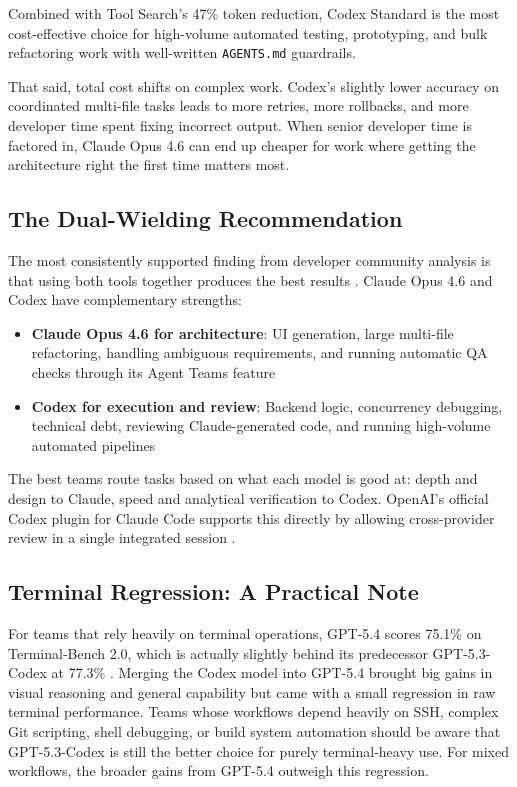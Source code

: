 \documentclass[conference]{IEEEtran}
\begin{document}
Combined with Tool Search's 47\% token reduction, Codex Standard is the most cost-effective choice for high-volume automated testing, prototyping, and bulk refactoring work with well-written \texttt{AGENTS.md} guardrails.

That said, total cost shifts on complex work. Codex's slightly lower accuracy on coordinated multi-file tasks leads to more retries, more rollbacks, and more developer time spent fixing incorrect output. When senior developer time is factored in, Claude Opus 4.6 can end up cheaper for work where getting the architecture right the first time matters most.

\subsection{The Dual-Wielding Recommendation}
The most consistently supported finding from developer community analysis is that using both tools together produces the best results \cite{chandler2026}. Claude Opus 4.6 and Codex have complementary strengths:

\begin{itemize}
    \item \textbf{Claude Opus 4.6 for architecture}: UI generation, large multi-file refactoring, handling ambiguous requirements, and running automatic QA checks through its Agent Teams feature
    \item \textbf{Codex for execution and review}: Backend logic, concurrency debugging, technical debt, reviewing Claude-generated code, and running high-volume automated pipelines
\end{itemize}

The best teams route tasks based on what each model is good at: depth and design to Claude, speed and analytical verification to Codex. OpenAI's official Codex plugin for Claude Code supports this directly by allowing cross-provider review in a single integrated session \cite{mindstudio2026}.

\subsection{Terminal Regression: A Practical Note}
For teams that rely heavily on terminal operations, GPT-5.4 scores 75.1\% on Terminal-Bench 2.0, which is actually slightly behind its predecessor GPT-5.3-Codex at 77.3\% \cite{nxcode2026}. Merging the Codex model into GPT-5.4 brought big gains in visual reasoning and general capability but came with a small regression in raw terminal performance. Teams whose workflows depend heavily on SSH, complex Git scripting, shell debugging, or build system automation should be aware that GPT-5.3-Codex is still the better choice for purely terminal-heavy use. For mixed workflows, the broader gains from GPT-5.4 outweigh this regression.
\end{document}
